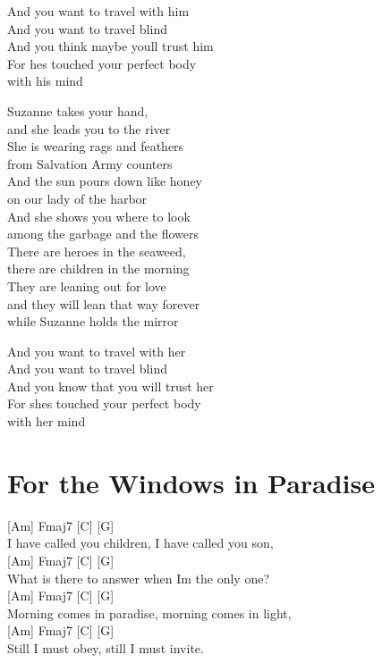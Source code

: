 \documentclass[
  letterpaper,
]{scrbook}
\begin{document}
And you want to travel with him\\
And you want to travel blind\\
And you think maybe you\textquotesingle ll trust him\\
For he\textquotesingle s touched your perfect body\\
with his mind

Suzanne takes your hand,\\
and she leads you to the river\\
She is wearing rags and feathers\\
from Salvation Army counters\\
And the sun pours down like honey\\
on our lady of the harbor\\
And she shows you where to look\\
among the garbage and the flowers\\
There are heroes in the seaweed,\\
there are children in the morning\\
They are leaning out for love\\
and they will lean that way forever\\
while Suzanne holds the mirror

And you want to travel with her\\
And you want to travel blind\\
And you know that you will trust her\\
For she\textquotesingle s touched your perfect body\\
with her mind

\hypertarget{for-the-windows-in-paradise}{%
\chapter{For the Windows in
Paradise}\label{for-the-windows-in-paradise}}

{[}Am{]} Fmaj7 {[}C{]} {[}G{]}\\
I have called you children, I have called you son,\\
{[}Am{]} Fmaj7 {[}C{]} {[}G{]}\\
What is there to answer when I\textquotesingle m the only one?\\
{[}Am{]} Fmaj7 {[}C{]} {[}G{]}\\
Morning comes in paradise, morning comes in light,\\
{[}Am{]} Fmaj7 {[}C{]} {[}G{]}\\
Still I must obey, still I must invite.
\end{document}
